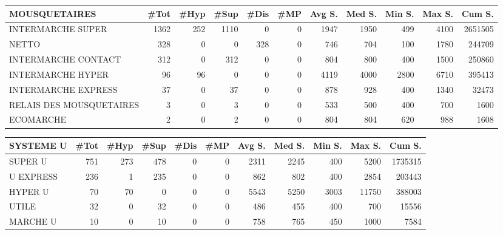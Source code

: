 \documentclass[11pt]{article}
\begin{document}
\begin{table}[H]
\footnotesize
\setlength{\tabcolsep}{2pt}
\begin{tabular}{lrrrrrrrrrr}
\toprule
MOUSQUETAIRES &       \#Tot &       \#Hyp &       \#Sup &       \#Dis &        \#MP &     Avg S. &     Med S. &     Min S. &     Max S. &     Cum S. \\
\midrule
INTERMARCHE SUPER        &       1362 &        252 &       1110 &          0 &          0 &       1947 &       1950 &        499 &       4100 &    2651505 \\
NETTO                    &        328 &          0 &          0 &        328 &          0 &        746 &        704 &        100 &       1780 &     244709 \\
INTERMARCHE CONTACT      &        312 &          0 &        312 &          0 &          0 &        804 &        800 &        400 &       1500 &     250860 \\
INTERMARCHE HYPER        &         96 &         96 &          0 &          0 &          0 &       4119 &       4000 &       2800 &       6710 &     395413 \\
INTERMARCHE EXPRESS      &         37 &          0 &         37 &          0 &          0 &        878 &        928 &        400 &       1340 &      32473 \\
RELAIS DES MOUSQUETAIRES &          3 &          0 &          3 &          0 &          0 &        533 &        500 &        400 &        700 &       1600 \\
ECOMARCHE                &          2 &          0 &          2 &          0 &          0 &        804 &        804 &        620 &        988 &       1608 \\
\bottomrule
\end{tabular}
\end{table}

\begin{table}[H]
\footnotesize
\setlength{\tabcolsep}{2pt}
\begin{tabular}{lrrrrrrrrrr}
\toprule
SYSTEME U &       \#Tot &       \#Hyp &       \#Sup &       \#Dis &        \#MP &     Avg S. &     Med S. &     Min S. &     Max S. &     Cum S. \\
\midrule
SUPER U   &        751 &        273 &        478 &          0 &          0 &       2311 &       2245 &        400 &       5200 &    1735315 \\
U EXPRESS &        236 &          1 &        235 &          0 &          0 &        862 &        802 &        400 &       2854 &     203443 \\
HYPER U   &         70 &         70 &          0 &          0 &          0 &       5543 &       5250 &       3003 &      11750 &     388003 \\
UTILE     &         32 &          0 &         32 &          0 &          0 &        486 &        455 &        400 &        700 &      15556 \\
MARCHE U  &         10 &          0 &         10 &          0 &          0 &        758 &        765 &        450 &       1000 &       7584 \\
\bottomrule
\end{tabular}
\end{table}
\end{document}
